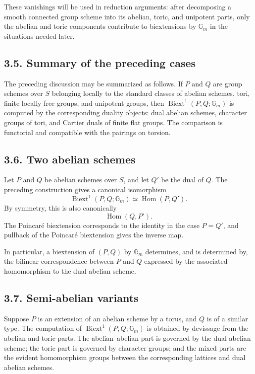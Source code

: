 \documentclass[11pt]{article}
\newcommand{\Gm}{\mathbb G_m}
\newcommand{\Hom}{\operatorname{Hom}}
\newcommand{\Biext}{\operatorname{Biext}}
\begin{document}
These vanishings will be used in reduction arguments: after decomposing a smooth
connected group scheme into its abelian, toric, and unipotent parts, only the
abelian and toric components contribute to biextensions by \(\Gm\) in the
situations needed later.

\subsection*{3.5. Summary of the preceding cases}

The preceding discussion may be summarized as follows. If \(P\) and \(Q\) are
group schemes over \(S\) belonging locally to the standard classes of abelian
schemes, tori, finite locally free groups, and unipotent groups, then
\(\Biext^1(P,Q;\Gm)\) is computed by the corresponding duality objects:
dual abelian schemes, character groups of tori, and Cartier duals of finite flat
groups. The comparison is functorial and compatible with the pairings on torsion.

\subsection*{3.6. Two abelian schemes}

Let \(P\) and \(Q\) be abelian schemes over \(S\), and let \(Q'\) be the dual of
\(Q\). The preceding construction gives a canonical isomorphism
\[
\Biext^1(P,Q;\Gm)\simeq \Hom(P,Q').
\]
By symmetry, this is also canonically
\[
\Hom(Q,P').
\]
The Poincaré biextension corresponds to the identity in the case \(P=Q'\), and
pullback of the Poincaré biextension gives the inverse map.

In particular, a biextension of \((P,Q)\) by \(\Gm\) determines, and is
determined by, the bilinear correspondence between \(P\) and \(Q\) expressed by
the associated homomorphism to the dual abelian scheme.

\subsection*{3.7. Semi-abelian variants}

Suppose \(P\) is an extension of an abelian scheme by a torus, and \(Q\) is of a
similar type. The computation of \(\Biext^1(P,Q;\Gm)\) is obtained by devissage
from the abelian and toric parts. The abelian--abelian part is governed by the
dual abelian scheme; the toric part is governed by character groups; and the
mixed parts are the evident homomorphism groups between the corresponding
lattices and dual abelian schemes.
\end{document}
